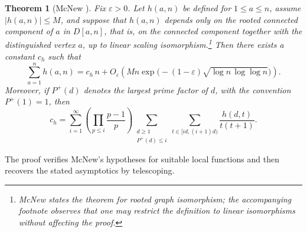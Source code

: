 \documentclass[11pt]{amsart}
\newtheorem{theorem}{Theorem}
\begin{document}
\begin{theorem}[McNew {\cite[Theorem~3 and footnote~1]{McNew21}}]\label{thm:mcnew}
Fix \(\varepsilon>0\). Let \(h(a,n)\) be defined for \(1\le a\le n\), assume \(|h(a,n)|\le M\), and suppose that \(h(a,n)\) depends only on the rooted connected component of \(a\) in \(D[a,n]\), that is, on the connected component together with the distinguished vertex \(a\), up to linear scaling isomorphism.\footnote{McNew states the theorem for rooted graph isomorphism; the accompanying footnote observes that one may restrict the definition to linear isomorphisms without affecting the proof.}
Then there exists a constant \(c_h\) such that
\[
\sum_{a=1}^{n} h(a,n)=c_h\,n+O_{\varepsilon}\!\left(
M n\exp\!\bigl(-(1-\varepsilon)\sqrt{\log n\,\log\log n}\bigr)
\right).
\]
Moreover, if \(P^+(d)\) denotes the largest prime factor of \(d\), with the convention \(P^+(1)=1\), then
\[
c_h=
\sum_{i=1}^{\infty}
\left(\prod_{p\le i}\frac{p-1}{p}\right)
\sum_{\substack{d\ge 1\\ P^+(d)\le i}}
\sum_{t\in[id,(i+1)d)}
\frac{h(d,t)}{t(t+1)}.
\]
\end{theorem}

The proof verifies McNew's hypotheses for suitable local functions and then recovers the stated asymptotics by telescoping.
\end{document}
